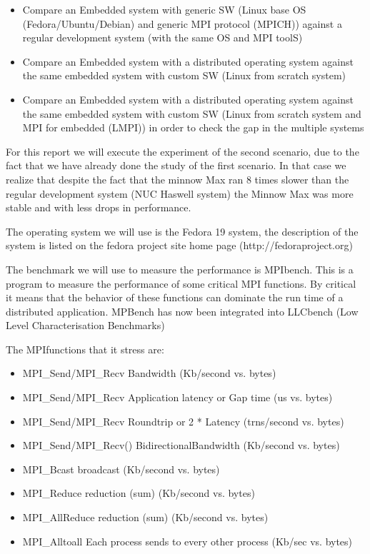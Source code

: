 \begin{itemize} 
    
    \item Compare an Embedded system with generic SW (Linux base OS
    (Fedora/Ubuntu/Debian) and generic MPI protocol (MPICH)) against a
    regular development system (with the same OS and MPI toolS)

    \item Compare an Embedded system with a distributed operating system
    against the same embedded system with custom SW (Linux from scratch system)


    \item Compare an Embedded system with a distributed operating system
    against the same embedded system with custom SW (Linux from scratch system and
    MPI for embedded (LMPI)) in order to check the gap in the multiple systems

\end{itemize}

For this report we will execute the experiment of the second scenario, due to the
fact that we have already done the study of the first scenario. In that case we
realize that despite the fact that the minnow Max ran 8 times slower than the
regular development system (NUC Haswell system) the Minnow Max was more stable
and with less drops in performance. 

The operating system we will use is the Fedora 19 system, the description of the
system is listed on the fedora project site home page (http://fedoraproject.org)

The benchmark we will use to measure the performance is MPIbench. This is a
program to measure the performance of some critical MPI functions. By critical
it means that the behavior of these functions can dominate the run time of a
distributed application. MPBench has now been integrated into LLCbench (Low
Level Characterisation Benchmarks) 

The MPIfunctions that it stress are: 


\begin{itemize}

\item MPI\_Send/MPI\_Recv Bandwidth (Kb/second vs. bytes) 
\item MPI\_Send/MPI\_Recv Application latency or Gap time (us vs. bytes)
\item MPI\_Send/MPI\_Recv Roundtrip or 2 * Latency (trns/second vs. bytes) 
\item MPI\_Send/MPI\_Recv() BidirectionalBandwidth (Kb/second vs. bytes) 
\item MPI\_Bcast broadcast (Kb/second vs. bytes) 
\item MPI\_Reduce reduction (sum) (Kb/second vs. bytes) 
\item MPI\_AllReduce reduction (sum) (Kb/second vs. bytes) 
\item MPI\_Alltoall Each process sends to every other process (Kb/sec vs. bytes) 

\end{itemize}


